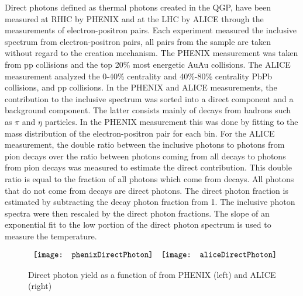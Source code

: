     Direct photons defined as thermal photons created in the QGP, have been 
      measured at RHIC by PHENIX \cite{phenixPhoton2010} and at the LHC by ALICE 
      \cite{photonALICE} through the measurements of electron-positron pairs.
    Each experiment measured the inclusive \pt{} spectrum from 
      electron-positron pairs, all pairs from the sample are taken without
      regard to the creation mechanism.
    The PHENIX measurement was taken from pp collisions and the top 20\% most 
      energetic AuAu collisions. 
    The ALICE measurement analyzed the 0-40\% centrality and 40\%-80\% centrality
      PbPb collisions, and pp collisions. 
    In the PHENIX and ALICE measurements, the contribution to the inclusive 
      spectrum was sorted into a direct component and a background component.
    The latter consists mainly of decays from hadrons such as $\pi$ and $\eta$
      particles. 
    In the PHENIX measurement this was done by fitting to the mass 
      distribution of the electron-positron pair for each \pt{} bin.
    For the ALICE measurement, the double ratio between the inclusive photons 
      to photons from pion decays over the ratio between photons coming from all decays 
      to photons from  pion decays was measured to estimate the direct 
      contribution.
    This double ratio is equal to the fraction of all photons which come from 
      decays. 
    All photons that do not come from decays are direct photons.
    The direct photon fraction is estimated by subtracting the decay photon 
      fraction from 1.
    The inclusive photon \pt{} spectra were then rescaled by the direct 
      photon fractions.
    The slope of an exponential fit to the low \pt{} portion of the direct 
      photon spectrum is used to measure the temperature.
    \begin{figure}[!Hhbt]
      \centering
      $ \begin{array}{c c}
        \texttt{[image: phenixDirectPhoton]} &
        \texttt{[image: aliceDirectPhoton]}
      \end{array} $
      \caption{Direct photon yield as a function of \pt{} from 
        PHENIX \cite{phenixPhoton2010} (left) and ALICE \cite{photonALICE} 
        (right)}
      \label{fig:directPhotonPt}
    \end{figure}

